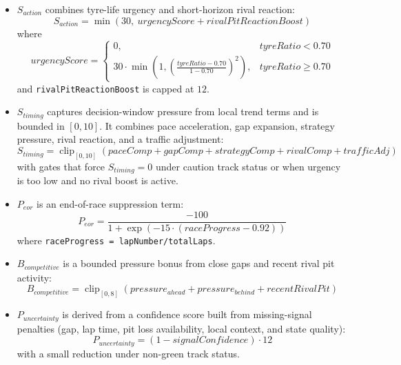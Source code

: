 \begin{itemize}
\[          \]
    \item $S_{action}$ combines tyre-life urgency and short-horizon rival reaction:
          \[
              S_{action} = \min(30,\ urgencyScore + rivalPitReactionBoost)
          \]
          where
          \[
              urgencyScore =
              \begin{cases}
                  0,                                                                          & tyreRatio < 0.70    \\
                  30 \cdot \min\!\left(1,\left(\frac{tyreRatio-0.70}{1-0.70}\right)^2\right), & tyreRatio \geq 0.70
              \end{cases}
          \]
          and \texttt{rivalPitReactionBoost} is capped at $12$.
    \item $S_{timing}$ captures decision-window pressure from local trend terms and is bounded in $[0,10]$. It combines pace acceleration, gap expansion, strategy pressure, rival reaction, and a traffic adjustment:
          \[
              S_{timing} = \operatorname{clip}_{[0,10]}\!\left(
              paceComp + gapComp + strategyComp + rivalComp + trafficAdj\right)
          \]
          with gates that force $S_{timing}=0$ under caution track status or when urgency is too low and no rival boost is active.
    \item $P_{eor}$ is an end-of-race suppression term:
          \[
              P_{eor} = \frac{-100}{1+\exp(-15\cdot(raceProgress-0.92))}
          \]
          where \texttt{raceProgress = lapNumber/totalLaps}.
    \item $B_{competitive}$ is a bounded pressure bonus from close gaps and recent rival pit activity:
          \[
              B_{competitive} = \operatorname{clip}_{[0,8]}\!\left(
              pressure_{ahead}+pressure_{behind}+recentRivalPit\right)
          \]
    \item $P_{uncertainty}$ is derived from a confidence score built from missing-signal penalties (gap, lap time, pit loss availability, local context, and state quality):
          \[
              P_{uncertainty} = (1-signalConfidence)\cdot 12
          \]
          with a small reduction under non-green track status.
\end{itemize}

